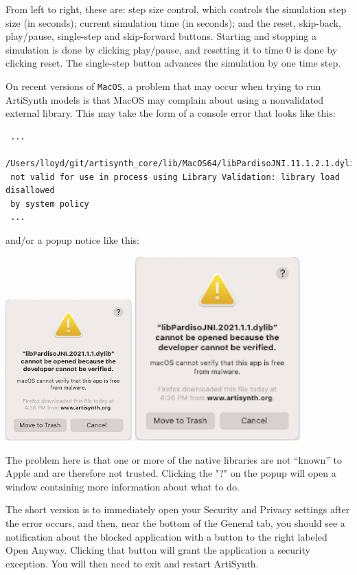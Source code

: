 From left to right, these are: step size control, which controls the
simulation step size (in seconds); current simulation time (in
seconds); and the {\sf reset}, {\sf skip-back}, {\sf play/pause}, {\sf
single-step} and {\sf skip-forward} buttons.  Starting and stopping a
simulation is done by clicking {\sf play/pause}, and resetting it to
time 0 is done by clicking {\sf reset}.  The {\sf single-step} button
advances the simulation by one time step.

\ifMacOS
\begin{sideblock}
On recent versions of {\tt MacOS}, a problem that may occur when trying to run
ArtiSynth models is that MacOS may complain about using a nonvalidated external
library. This may take the form of a console error that looks like this:
\begin{verbatim}
 ...
 /Users/lloyd/git/artisynth_core/lib/MacOS64/libPardisoJNI.11.1.2.1.dylib)
 not valid for use in process using Library Validation: library load disallowed
 by system policy 
 ...
\end{verbatim}
and/or a popup notice like this:
\begin{center}
\iflatexml
  \includegraphics[]{images/MacSecurityNotice}
\else
  \includegraphics[width=2.5in]{images/MacSecurityNotice}
\fi
\end{center}
The problem here is that one or more of the native libraries are not ``known''
to Apple and are therefore not trusted. Clicking the "?" on the popup will
open a window containing more information about what to do.

The short version is to immediately open your Security and Privacy
settings after the error occurs, and then, near the bottom of the {\sf
General} tab, you should see a notification about the blocked
application with a button to the right labeled {\sf Open
Anyway}. Clicking that button will grant the application a security
exception. You will then need to exit and restart ArtiSynth.
\end{sideblock}
\fi

